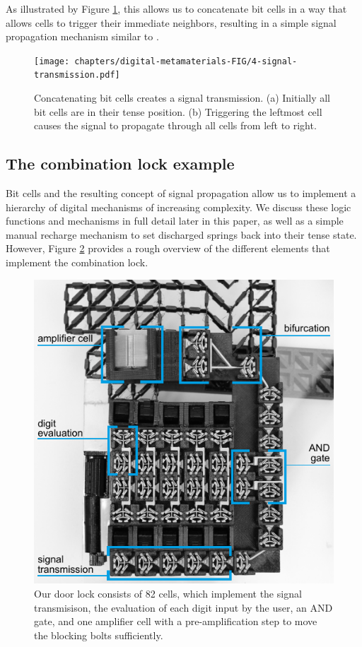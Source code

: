 As illustrated by Figure \ref{fig:4-signal-transmission}, this allows us to concatenate bit cells in a way that allows cells to trigger their immediate neighbors, resulting in a simple signal propagation mechanism similar to \cite{Raney2016}.

\begin{figure} [h]  
    \texttt{[image: chapters/digital-metamaterials-FIG/4-signal-transmission.pdf]}
    \caption[Short figure name.]{Concatenating bit cells creates a signal transmission. (a) Initially all bit cells are in their tense position. (b) Triggering the leftmost cell causes the signal to propagate through all cells from left to right.
    \label{fig:4-signal-transmission}}
\end{figure}

\subsection{The combination lock example}

Bit cells and the resulting concept of signal propagation allow us to implement a hierarchy of digital mechanisms of increasing complexity. We discuss these logic functions and mechanisms in full detail later in this paper, as well as a simple manual recharge mechanism to set discharged springs back into their tense state. However, Figure \ref{fig:5-elements-in-the-door-lock} provides a rough overview of the different elements that implement the combination lock.

\begin{figure} [h]  
    \includegraphics[width=\textwidth]{chapters/digital-metamaterials-FIG/5-elements-in-the-door-lock.pdf}
    \caption[Short figure name.]{Our door lock consists of 82 cells, which implement the signal transmisison, the evaluation of each digit input by the user, an AND gate, and one amplifier cell with a pre-amplification step to move the blocking bolts sufficiently.
    \label{fig:5-elements-in-the-door-lock}}
\end{figure}

